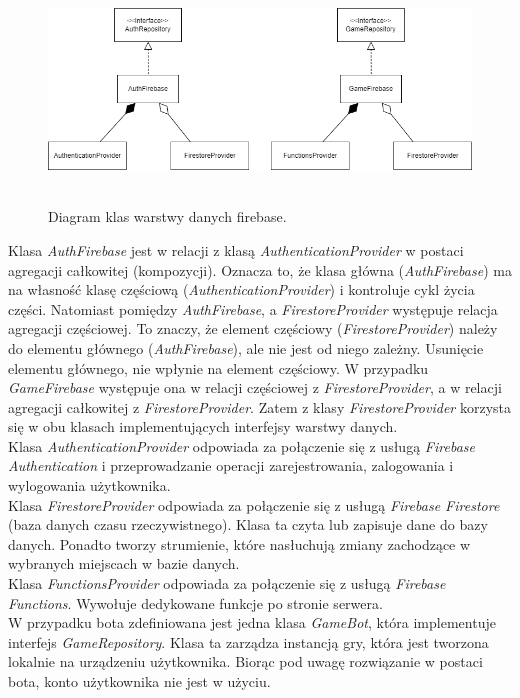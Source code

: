 \begin{figure}[h!]
	\begin{center}
		\includegraphics[width=16cm,height=6cm]{img/firebase-client.png}
	\end{center}
	\caption{{\color{dgray}Diagram klas warstwy danych firebase.}} 
	\label{firebase}
\end{figure}  
Klasa \emph{AuthFirebase} jest w relacji z klasą \emph{AuthenticationProvider} w postaci agregacji całkowitej (kompozycji). Oznacza to, że klasa główna (\emph{AuthFirebase}) ma na własność klasę częściową (\emph{AuthenticationProvider}) i kontroluje cykl życia części. Natomiast pomiędzy \emph{AuthFirebase}, a \emph{FirestoreProvider} występuje relacja agregacji częściowej. To znaczy, że element częściowy (\emph{FirestoreProvider}) należy do elementu głównego (\emph{AuthFirebase}), ale nie jest od niego zależny. Usunięcie elementu głównego, nie wpłynie na element częściowy. W przypadku \emph{GameFirebase} występuje ona w relacji częściowej z \emph{FirestoreProvider}, a w relacji agregacji całkowitej z \emph{FirestoreProvider}. Zatem z klasy \emph{FirestoreProvider} korzysta się w obu klasach implementujących interfejsy warstwy danych. \\ 
Klasa \emph{AuthenticationProvider} odpowiada za połączenie się z usługą \emph{Firebase Authentication} i przeprowadzanie operacji zarejestrowania, zalogowania i wylogowania użytkownika. \\
Klasa \emph{FirestoreProvider} odpowiada za połączenie się z usługą \emph{Firebase Firestore} (baza danych czasu rzeczywistnego). Klasa ta czyta lub zapisuje dane do bazy danych. Ponadto tworzy strumienie, które nasłuchują zmiany zachodzące w wybranych miejscach w bazie danych. \\
Klasa \emph{FunctionsProvider} odpowiada za połączenie się z usługą \emph{Firebase Functions}. Wywołuje dedykowane funkcje po stronie serwera. \\
W przypadku bota zdefiniowana jest jedna klasa \emph{GameBot}, która implementuje interfejs \emph{GameRepository}. Klasa ta zarządza instancją gry, która jest tworzona lokalnie na urządzeniu użytkownika. Biorąc pod uwagę rozwiązanie w postaci bota, konto użytkownika nie jest w użyciu. 
